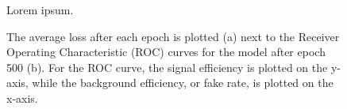 \begin{figure}[!htb]
    \centering
    \qquad
    \caption{
        Lorem ipsum.
    }
\end{figure}

\begin{figure}[!htb]
    \centering
    \qquad
    \caption{
        The average loss after each epoch is plotted (a) next to the Receiver Operating Characteristic (ROC) curves for the model after epoch 500 (b). 
        For the ROC curve, the signal efficiency is plotted on the y-axis, while the background efficiency, or fake rate, is plotted on the x-axis. 
    }
\end{figure}


